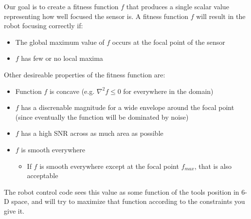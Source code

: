 \documentclass[11pt]{article}
\begin{document}
Our goal is to create a fitness function $f$ that produces a single scalar value representing how well focused the sensor is. A fitness function $f$ will result in the robot focusing correctly if:
\begin{itemize}
    \item The global maximum value of $f$ occurs at the focal point of the sensor
    \item $f$ has few or no local maxima
\end{itemize}
Other desireable properties of the fitness function are:
\begin{itemize}
    \item Function $f$ is concave (e.g. $\nabla^2 f \leq 0$ for everywhere in the domain)
    \item $f$ has a discrenable magnitude for a wide envelope around the focal point (since eventually the function will be dominated by noise)
    \item $f$ has a high SNR across as much area as possible
    \item $f$ is smooth everywhere
    \begin{itemize}
        \item If $f$ is smooth everywhere except at the focal point $f_{max}$, that is also acceptable
    \end{itemize}
\end{itemize}
The robot control code sees this value as some function of the tools position in 6-D space, and will try to maximize that function according to the constraints you give it.
\end{document}
